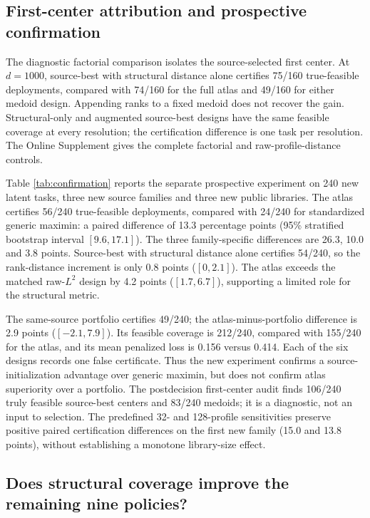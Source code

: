 \subsection{First-center attribution and prospective confirmation}

The diagnostic factorial comparison isolates the source-selected first center.
At $d=1000$, source-best with structural distance alone certifies 75/160
true-feasible deployments, compared with 74/160 for the full atlas and 49/160
for either medoid design.  Appending ranks to a fixed medoid does not recover
the gain.  Structural-only and augmented source-best designs have the same
feasible coverage at every resolution; the certification difference is one
task per resolution.  The Online Supplement gives the complete factorial and
raw-profile-distance controls.

Table \ref{tab:confirmation} reports the separate prospective experiment on
240 new latent tasks, three new source families and three new public libraries.
The atlas certifies 56/240 true-feasible deployments, compared with 24/240 for
standardized generic maximin: a paired difference of 13.3 percentage points
(95\% stratified bootstrap interval $[9.6,17.1]$).  The three family-specific
differences are 26.3, 10.0 and 3.8 points.  Source-best with structural distance
alone certifies 54/240, so the rank-distance increment is only 0.8 points
($[0,2.1]$).  The atlas exceeds the matched raw-$L^2$ design by 4.2 points
($[1.7,6.7]$), supporting a limited role for the structural metric.

The same-source portfolio certifies 49/240; the atlas-minus-portfolio
difference is 2.9 points ($[-2.1,7.9]$).  Its feasible coverage is 212/240,
compared with 155/240 for the atlas, and its mean penalized loss is 0.156
versus 0.414.  Each of the six designs records one false certificate.  Thus
the new experiment confirms a source-initialization advantage over generic
maximin, but does not confirm atlas superiority over a portfolio.  The
postdecision first-center audit finds 106/240 truly feasible source-best
centers and 83/240 medoids; it is a diagnostic, not an input to selection.
The predefined 32- and 128-profile sensitivities preserve positive paired
certification differences on the first new family (15.0 and 13.8 points),
without establishing a monotone library-size effect.

\subsection{Does structural coverage improve the remaining nine policies?}

